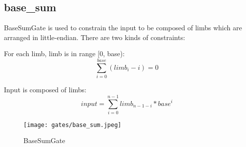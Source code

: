 \subsection{base\_sum}

BaseSumGate is used to constrain the input to be composed of limbs which are arranged in little-endian. There are two kinds of constraints:

For each limb, limb is in range [0, base):
\[\sum_{i=0}^{base}(limb_i - i) = 0\]

Input is composed of limbs:
\[input = \sum_{i=0}^{n-1} limb_{n-1-i} * base^i\]

\begin{figure}[!h]
    \centering
    \texttt{[image: gates/base\_sum.jpeg]}
    \caption{BaseSumGate}
    \label{fig:base-sum}
\end{figure}